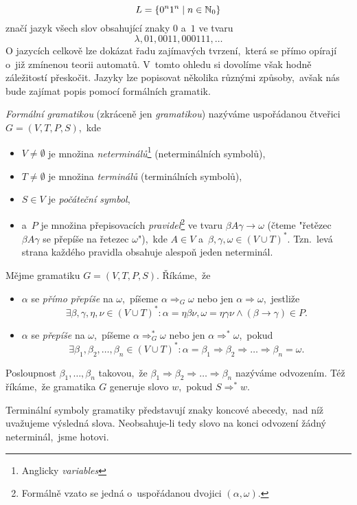 \[L=\left\{0^n1^n\mid n\in\mathbb{N}_0\right\}\]
značí jazyk všech slov obsahující znaky $0$ a~$1$ ve tvaru
\[\lambda,01,0011,000111,\ldots\]
O jazycích celkově lze dokázat řadu zajímavých tvrzení,~která se přímo opírají o~již zmínenou teorii automatů. V~tomto ohledu si dovolíme však hodně záležitostí přeskočit. Jazyky lze popisovat několika různými způsoby,~avšak nás bude zajímat popis pomocí formálních gramatik.
\begin{definition}\label{def:formalni-gramatika}
    \emph{Formální gramatikou} (zkráceně jen \emph{gramatikou}) nazýváme uspořádanou čtveřici $G=(V,T,P,S)$,~kde
    \begin{itemize}
        \item $V\neq\emptyset$ je množina \emph{neterminálů}\footnote{Anglicky \emph{variables}} (neterminálních symbolů),
        \item $T\neq\emptyset$ je množina \emph{terminálů} (terminálních symbolů),
        \item $S\in V$ je \emph{počáteční symbol},
        \item a~$P$ je množina přepisovacích \emph{pravidel}\footnote{Formálně vzato se jedná o~uspořádanou dvojici $(\alpha,\omega)$.} ve tvaru $\beta A\gamma\to\omega$ (čteme "řetězec $\beta A\gamma$ se přepíše na řetezec $\omega$"),~kde $A\in V$ a~$\beta,\gamma,\omega\in(V\cup T)^*$. Tzn.~levá strana každého pravidla obsahuje alespoň jeden neterminál.
    \end{itemize}
\end{definition}
\begin{definition}\label{def:odvozeni-slova-v-gramatice}
    Mějme gramatiku $G=(V,T,P,S)$. Říkáme,~že
    \begin{itemize}
        \item $\alpha$ se \emph{přímo přepíše} na $\omega$,~píšeme $\alpha\Rightarrow_G\omega$ nebo jen $\alpha\Rightarrow\omega$,~jestliže
        \[\exists\beta,\gamma,\eta,\nu\in(V\cup T)^*: \alpha=\eta\beta\nu,\omega=\eta\gamma\nu\land(\beta\to\gamma)\in P.\]
        \item $\alpha$ se \emph{přepíše} na $\omega$,~píšeme $\alpha\Rightarrow_G^*\omega$ nebo jen $\alpha\Rightarrow^*\omega$,~pokud
        \[\exists\beta_1,\beta_2,\ldots,\beta_n\in(V\cup T)^*:\alpha=\beta_1\Rightarrow\beta_2\Rightarrow\dots\Rightarrow\beta_n=\omega.\]
    \end{itemize}
    Posloupnost $\beta_1,\ldots,\beta_n$ takovou,~že $\beta_1\Rightarrow\beta_2\Rightarrow\dots\Rightarrow\beta_n$ nazýváme odvozením. Též říkáme,~že gramatika $G$ generuje slovo $w$,~pokud $S\Rightarrow^* w$.
\end{definition}
Terminální symboly gramatiky představují znaky koncové abecedy,~nad níž uvažujeme výsledná slova. Neobsahuje-li tedy slovo na konci odvození žádný neterminál,~jsme hotovi.

